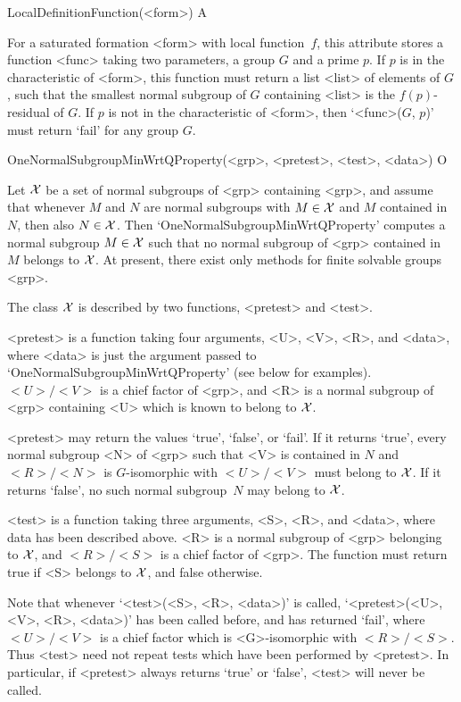 \>LocalDefinitionFunction(<form>) A

For a saturated formation <form> with local function~$f$, this attribute
stores a function <func> taking two parameters, a group
$G$ and a prime $p$. If $p$ is in the characteristic of <form>, this
function must return a list <list> of elements of
$G$, such that the smallest normal subgroup of $G$ containing <list> is the
$f(p)$-residual of $G$. If $p$ is not in the characteristic of <form>, 
then `<func>($G$, $p$)' must return `fail' for any group $G$. 


\null


\>OneNormalSubgroupMinWrtQProperty(<grp>, <pretest>, <test>, <data>) O

Let $\cal X$ be a set of normal subgroups of <grp> containing <grp>, and
assume that whenever
$M$ and $N$ are normal subgroups with $M \in \cal X$ and $M$
contained in $N$, then also $N \in \cal X$. Then
`OneNormalSubgroupMinWrtQProperty' computes a normal subgroup $M \in \cal X$
such that no normal subgroup of <grp> contained in $M$ belongs to $\cal X$. 
At present, there exist only methods for finite solvable groups <grp>.


The class $\cal X$ is described by two functions, <pretest> and <test>. 

<pretest> is a function taking four arguments, <U>, <V>, <R>, and <data>,
where <data> is just the argument passed to
`OneNormalSubgroupMinWrtQProperty' (see below for examples). $<U>/<V>$ is a
chief factor of <grp>, and  <R> is a normal subgroup of <grp> containing <U>
which is known to belong to
$\cal X$.

<pretest> may return the values `true', `false', or `fail'. If it returns 
`true', every normal subgroup <N> of <grp> such that <V> is
contained in $N$ and $<R>/<N>$ is
$G$-isomorphic with $<U>/<V>$ must belong to $\cal X$. If it returns
`false', no such normal subgroup~$N$ may belong to $\cal X$. 

<test> is a function taking three arguments, <S>, <R>, and <data>, where
data has been described above. <R> is a normal subgroup of <grp> belonging to
$\cal X$, and $<R>/<S>$ is a chief factor of <grp>. The function must return
true if <S> belongs to $\cal X$, and false otherwise. 

Note that whenever `<test>(<S>, <R>, <data>)' is called, 
`<pretest>(<U>, <V>, <R>, <data>)' has been called before, and has returned
`fail', where  $<U>/<V>$ is a  chief factor which is <G>-isomorphic with
$<R>/<S>$. Thus <test> need not repeat tests which have been performed by
<pretest>. In particular, if <pretest> always returns `true' or `false',
<test> will never be called.

